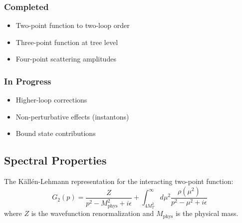 \subsubsection{Completed}
\begin{itemize}
    \item Two-point function to two-loop order
    \item Three-point function at tree level
    \item Four-point scattering amplitudes
\end{itemize}

\subsubsection{In Progress}
\begin{itemize}
    \item Higher-loop corrections
    \item Non-perturbative effects (instantons)
    \item Bound state contributions
\end{itemize}

\subsection{Spectral Properties}

The Källén-Lehmann representation for the interacting two-point function:
\begin{equation}
    G_2(p) = \frac{Z}{p^2 - M_{\text{phys}}^2 + i\epsilon} + \int_{4M_T^2}^\infty d\mu^2 \frac{\rho(\mu^2)}{p^2 - \mu^2 + i\epsilon}
\end{equation}
where $Z$ is the wavefunction renormalization and $M_{\text{phys}}$ is the physical mass.

